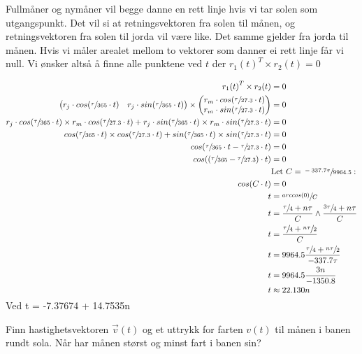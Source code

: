 \documentclass{../../myassignment}
\begin{document}
	\begin{answer}
		Fullm{\aa}ner og nym{\aa}ner vil begge danne en rett linje hvis vi tar solen som utgangspunkt. Det vil si at retningsvektoren fra solen til m{\aa}nen, og retningsvektoren fra solen til jorda vil v{\ae}re like. Det samme gjelder fra jorda til m{\aa}nen. Hvis vi m{\aa}ler arealet mellom to vektorer som danner ei rett linje f{\aa}r vi null. Vi {\o}nsker alts{\aa} {\aa} finne alle punktene ved $t$ der ${r_1(t)}^T \times {r_2}(t) = 0$

		\begin{align*}
			{r_1(t)}^T \times r_2(t) &= 0\\
			\begin{pmatrix} r_j\cdot cos(\sfrac{\tau}{365} \cdot t) & r_j \cdot sin(\sfrac{\tau}{365} \cdot t) \end{pmatrix} \times \begin{pmatrix} r_m\cdot cos(\sfrac{\tau}{27.3} \cdot t)\\r_m \cdot sin(\sfrac{\tau}{27.3} \cdot t) \end{pmatrix} &= 0 \\
			r_j\cdot cos(\sfrac{\tau}{365} \cdot t) \times r_m\cdot cos(\sfrac{\tau}{27.3} \cdot t) + r_j \cdot sin(\sfrac{\tau}{365} \cdot t) \times r_m \cdot sin(\sfrac{\tau}{27.3} \cdot t) &= 0 \\
			cos(\sfrac{\tau}{365} \cdot t) \times cos(\sfrac{\tau}{27.3} \cdot t) + sin(\sfrac{\tau}{365} \cdot t) \times sin(\sfrac{\tau}{27.3} \cdot t) &= 0\\
			cos(\sfrac{\tau}{365} \cdot t - \sfrac{\tau}{27.3} \cdot t) &= 0\\
			cos((\sfrac{\tau}{365} - \sfrac{\tau}{27.3}) \cdot t) &= 0\\
			&\text{Let } C = \sfrac{-337.7\tau}{9964.5}:\\
			cos(C \cdot t) &= 0\\
			t &= \sfrac{arccos(0)}{C}\\
			t &= \dfrac{\sfrac{\tau}{4} + n\tau}{C} \land \dfrac{\sfrac{3\tau}{4} + n\tau}{C}\\
			t &= \dfrac{\sfrac{\tau}{4} + \sfrac{n\tau}{2}}{C}\\
			t &= 9964.5\dfrac{\sfrac{\tau}{4} + \sfrac{n\tau}{2}}{-337.7\tau}\\
			t &= 9964.5\dfrac{3n}{-1350.8}\\
			t &\approx 22.130n \\
		\end{align*}
		Ved t = -7.37674 + 14.7535n

	\end{answer}

	\begin{problem}
		Finn hastighetsvektoren $\vec{v}(t)$ og et uttrykk for farten $v(t)$ til månen i banen rundt sola. Når har månen størst og minst fart i banen sin?
	\end{problem}
\end{document}
